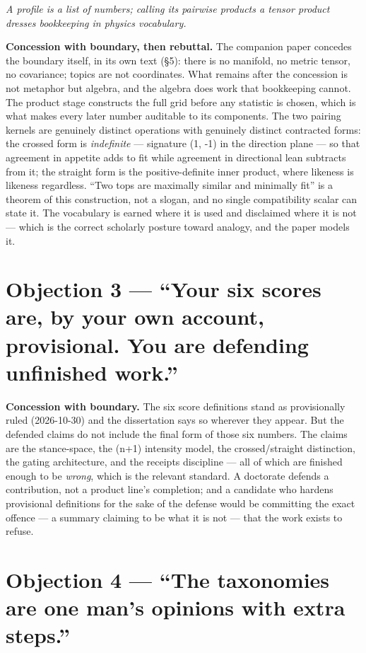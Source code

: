 \emph{A profile is a list of numbers; calling its pairwise products a
tensor product dresses bookkeeping in physics vocabulary.}

\textbf{Concession with boundary, then rebuttal.} The companion paper
concedes the boundary itself, in its own text (\S 5): there is no
manifold, no metric tensor, no covariance; topics are not coordinates.
What remains after the concession is not metaphor but algebra, and the
algebra does work that bookkeeping cannot. The product stage constructs
the full grid before any statistic is chosen, which is what makes every
later number auditable to its components. The two pairing kernels are
genuinely distinct operations with genuinely distinct contracted forms:
the crossed form is \emph{indefinite} --- signature (1, -1) in the
direction plane --- so that agreement in appetite adds to fit while
agreement in directional lean subtracts from it; the straight form is
the positive-definite inner product, where likeness is likeness
regardless. ``Two tops are maximally similar and minimally fit'' is a
theorem of this construction, not a slogan, and no single compatibility
scalar can state it. The vocabulary is earned where it is used and
disclaimed where it is not --- which is the correct scholarly posture
toward analogy, and the paper models it.

\section{Objection 3 --- ``Your six scores are, by your own account,
provisional. You are defending unfinished
work.''}\label{objection-3-your-six-scores-are-by-your-own-account-provisional.-you-are-defending-unfinished-work.}

\textbf{Concession with boundary.} The six score definitions stand as
provisionally ruled (2026-10-30) and the dissertation says so wherever
they appear. But the defended claims do not include the final form of
those six numbers. The claims are the stance-space, the (n+1) intensity
model, the crossed/straight distinction, the gating architecture, and
the receipts discipline --- all of which are finished enough to be
\emph{wrong}, which is the relevant standard. A doctorate defends a
contribution, not a product line's completion; and a candidate who
hardens provisional definitions for the sake of the defense would be
committing the exact offence --- a summary claiming to be what it is not
--- that the work exists to refuse.

\section{Objection 4 --- ``The taxonomies are one man's opinions with
extra
steps.''}\label{objection-4-the-taxonomies-are-one-mans-opinions-with-extra-steps.}

